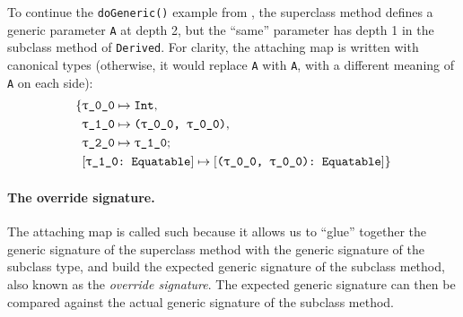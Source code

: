 \documentclass[../generics]{subfiles}
\begin{document}
\begin{example}
To continue the \texttt{doGeneric()} example from , the superclass method defines a generic parameter \texttt{A} at depth 2, but the ``same'' parameter has depth 1 in the subclass method of \texttt{Derived}. For clarity, the attaching map is written with canonical types (otherwise, it would replace \texttt{A} with \texttt{A}, with a different meaning of \texttt{A} on each side):
\begin{align*}
\SubstMapC{
&\SubstType{\ttgp{0}{0}}{Int},\\
&\SubstType{\ttgp{1}{0}}{(\ttgp{0}{0}, \ttgp{0}{0})},\\
&\SubstType{\ttgp{2}{0}}{\ttgp{1}{0}}
}{
\\
&\SubstConf{\ttgp{1}{0}}{(\ttgp{0}{0}, \ttgp{0}{0})}{Equatable}
}
\end{align*}
\end{example}

\paragraph{The override signature.}
The attaching map is called such because it allows us to ``glue'' together the generic signature of the superclass method with the generic signature of the subclass type, and build the expected generic signature of the subclass method, also known as the \emph{override signature}. The expected generic signature can then be compared against the actual generic signature of the subclass method.
\end{document}
